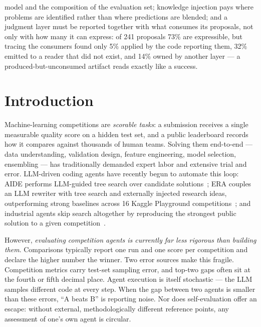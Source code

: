 \documentclass[11pt,a4paper]{article}
\begin{document}
model and the composition of the evaluation set; knowledge injection pays where problems are identified rather than where predictions are blended; and a judgment layer must be reported together with what consumes its proposals, not only with how many it can express: of 241 proposals 73\% are expressible, but tracing the consumers found only 5\% applied by the code reporting them, 32\% emitted to a reader that did not exist, and 14\% owned by another layer --- a produced-but-unconsumed artifact reads exactly like a success.

\vspace{0.5em}

\section{Introduction}

Machine-learning competitions are \emph{scorable tasks}: a submission receives a single measurable quality score on a hidden test set, and a public leaderboard records how it compares against thousands of human teams. Solving them end-to-end --- data understanding, validation design, feature engineering, model selection, ensembling --- has traditionally demanded expert labor and extensive trial and error. LLM-driven coding agents have recently begun to automate this loop: AIDE performs LLM-guided tree search over candidate solutions~\cite{aide2025}; ERA couples an LLM rewriter with tree search and externally injected research ideas, outperforming strong baselines across 16 Kaggle Playground competitions~\cite{aygun2026}; and industrial agents skip search altogether by reproducing the strongest public solution to a given competition~\cite{nvidia2026}.

However, \emph{evaluating competition agents is currently far less rigorous than building them}. Comparisons typically report one run and one score per competition and declare the higher number the winner. Two error sources make this fragile. Competition metrics carry test-set sampling error, and top-two gaps often sit at the fourth or fifth decimal place. Agent execution is itself stochastic --- the LLM samples different code at every step. When the gap between two agents is smaller than these errors, ``A beats B'' is reporting noise. Nor does self-evaluation offer an escape: without external, methodologically different reference points, any assessment of one's own agent is circular.
\end{document}
